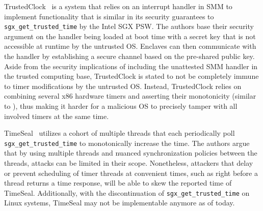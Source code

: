 \documentclass[sigplan,10pt]{acmart}
\begin{document}
TrustedClock~\cite{jigsaw} is a system that relies on an interrupt handler in
\ac{SMM} to implement functionality that is similar in its security guarantees
to \texttt{sgx\_get\_trusted\_time} by the Intel SGX \ac{PSW}. The authors base
their security argument on the handler being loaded at boot time with a secret
key that is not accessible at runtime by the untrusted OS. Enclaves can then
communicate with the handler by establishing a secure channel based on the
pre-shared public key. Aside from the security implications of including the
unattested SMM handler in the trusted computing base,
TrustedClock is stated to not be completely immune to timer modifications by the untrusted OS.
Instead, TrustedClock relies on combining several x86 hardware timers
and asserting their monotonicity (similar to \Tone{}), thus
making it harder for a malicious OS to precisely tamper with all involved
timers at the same time.

TimeSeal~\cite{anwar2019securing} utilizes a cohort of multiple threads that
each periodically poll \texttt{sgx\_get\_trusted\_time} to monotonically
increase the time. The authors argue that by using multiple threads and nuanced
synchronization policies between the threads, attacks can be limited in their
scope. Nonetheless, attackers that delay or prevent scheduling of timer threads
at convenient times, such as right before a thread returns a time response, will
be able to skew the reported time of TimeSeal. Additionally, with the
discontinuation of \texttt{sgx\_get\_trusted\_time} on Linux systems, TimeSeal
may not be implementable anymore as of today.
\end{document}
